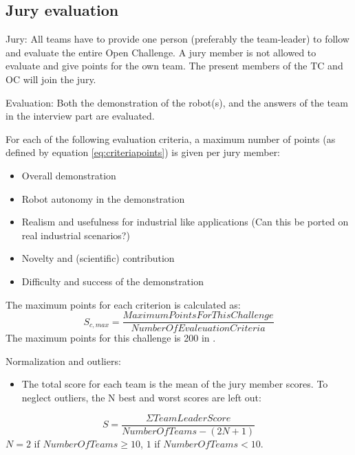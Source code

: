 \subsection{Jury​ ​evaluation}
Jury​:​ All teams have to provide one person (preferably the team-leader) to follow and evaluate the entire Open Challenge. A jury member is not allowed to evaluate and give points for the own team. The present members of the TC and OC will join the jury.  \par 
Evaluation:​ Both the demonstration of the robot(s), and the answers of the team in the interview part are evaluated. \par
For each of the following evaluation criteria, a maximum number of points (as defined by equation \ref{eq:criteriapoints}) is given per jury member:
\begin{itemize}
\item Overall demonstration
\item Robot autonomy in the demonstration
\item Realism and usefulness for industrial like applications (Can this be ported on real industrial scenarios?)
\item Novelty and (scientific) contribution
\item Difficulty and success of the demonstration
\end{itemize}

The maximum points for each criterion is calculated as:
\begin{equation}\label{eq:criteriapoints}
S_{c,max}=\frac{MaximumPointsForThisChallenge}{NumberOfEvaleuationCriteria}
\end{equation}
The maximum points for this challenge is 200 in \RCAW \YEAR .

Normalization​ ​and​ ​outliers:
\begin{itemize}
\item The total score for each team is the mean of the jury member scores. To neglect outliers, the N best and worst scores are left out:
\end{itemize}

\begin{equation}\label{eq:totalpoints}
S=\frac{\Sigma TeamLeaderScore}{NumberOfTeams−(2N+1)}
\end{equation} 
$N = 2$ if $NumberOfTeams \geq 10$, $1$ if $NumberOfTeams < 10$. \par



